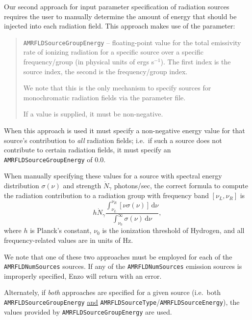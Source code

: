 \documentclass[10pt]{article}
\renewcommand{\(}{\left(}
\renewcommand{\)}{\right)}
\begin{document}
Our second approach for input parameter specification of radiation
sources requires the user to manually determine the amount of energy
that should be injected into each radiation field.  This approach
makes use of the parameter:
%
\blockquote{{\tt AMRFLDSourceGroupEnergy} -- floating-point value for
  the total emissivity rate of ionizing radiation for a specific
  source over a specific frequency/group (in physical units of ergs 
  s$^{-1}$).  The first index is the source index, the second is the
  frequency/group index. 

  We note that this is the only mechanism to specify sources
  for monochromatic radiation fields via the parameter file.

  If a value is supplied, it must be non-negative.}
%
When this approach is used it must specify a non-negative energy value
for that source's contribution to {\em all} radiation fields; i.e.~if
such a source does not contribute to certain radiation fields, it must
specify an {\tt AMRFLDSourceGroupEnergy} of 0.0.

When manually specifying these values for a source with spectral
energy distribution $\sigma(\nu)$ and strength $\dot{N}_{\gamma}$
photons/sec, the correct formula to compute the radiation contribution
to a radiation group with frequency band $\left[\nu_L, \nu_R\right]$ is
\begin{equation}
  \label{eq:emission_integral}
  h \dot{N}_{\gamma} 
  \frac{\int_{\nu_L}^{\nu_R}\left[\nu \sigma(\nu)\right]\,\mathrm d\nu}
       {\int_{\nu_0}^{\infty}\sigma(\nu)\,\mathrm d\nu},
\end{equation}
where $h$ is Planck's constant, $\nu_0$ is the ionization threshold of
Hydrogen, and all frequency-related values are in units of Hz.

We note that one of these two approaches must be employed for
each of the {\tt AMRFLDNumSources} sources.  If any of the 
{\tt AMRFLDNumSources} emission sources is improperly specified, Enzo
will return with an error.

Alternately, if {\em both} approaches are specified for a given source
(i.e.~both {\tt AMRFLDSourceGroupEnergy} \underline{and} 
{\tt AMRFLDSourceType}/{\tt AMRFLDSourceEnergy}), the values provided by
{\tt AMRFLDSourceGroupEnergy} are used.
\end{document}
